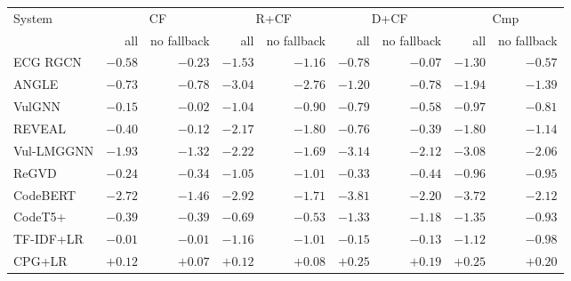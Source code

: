 \begin{tabular}{lrrrrrrrr}
\toprule
System & \multicolumn{2}{c}{CF} & \multicolumn{2}{c}{R+CF} & \multicolumn{2}{c}{D+CF} & \multicolumn{2}{c}{Cmp} \\
 & all & no fallback & all & no fallback & all & no fallback & all & no fallback \\
\midrule
ECG RGCN & $-0.58$ & $-0.23$ & $\mathbf{-1.53}$ & $\mathbf{-1.16}$ & $\mathbf{-0.78}$ & $-0.07$ & $\mathbf{-1.30}$ & $-0.57$ \\
ANGLE & $-0.73$ & $-0.78$ & $-3.04$ & $-2.76$ & $\mathbf{-1.20}$ & $\mathbf{-0.78}$ & $\mathbf{-1.94}$ & $\mathbf{-1.39}$ \\
VulGNN & $-0.15$ & $-0.02$ & $-1.04$ & $-0.90$ & $-0.79$ & $-0.58$ & $-0.97$ & $-0.81$ \\
REVEAL & $-0.40$ & $-0.12$ & $\mathbf{-2.17}$ & $\mathbf{-1.80}$ & $-0.76$ & $-0.39$ & $\mathbf{-1.80}$ & $\mathbf{-1.14}$ \\
Vul-LMGGNN & $\mathbf{-1.93}$ & $\mathbf{-1.32}$ & $\mathbf{-2.22}$ & $\mathbf{-1.69}$ & $\mathbf{-3.14}$ & $\mathbf{-2.12}$ & $\mathbf{-3.08}$ & $\mathbf{-2.06}$ \\
ReGVD & $-0.24$ & $-0.34$ & $\mathbf{-1.05}$ & $\mathbf{-1.01}$ & $-0.33$ & $-0.44$ & $-0.96$ & $-0.95$ \\
CodeBERT & $\mathbf{-2.72}$ & $\mathbf{-1.46}$ & $\mathbf{-2.92}$ & $\mathbf{-1.71}$ & $\mathbf{-3.81}$ & $\mathbf{-2.20}$ & $\mathbf{-3.72}$ & $\mathbf{-2.12}$ \\
CodeT5+ & $-0.39$ & $-0.39$ & $-0.69$ & $-0.53$ & $-1.33$ & $-1.18$ & $-1.35$ & $-0.93$ \\
TF-IDF+LR & $-0.01$ & $-0.01$ & $\mathbf{-1.16}$ & $\mathbf{-1.01}$ & $-0.15$ & $-0.13$ & $\mathbf{-1.12}$ & $\mathbf{-0.98}$ \\
CPG+LR & $+0.12$ & $+0.07$ & $+0.12$ & $+0.08$ & $+0.25$ & $+0.19$ & $+0.25$ & $+0.20$ \\
\bottomrule
\end{tabular}
